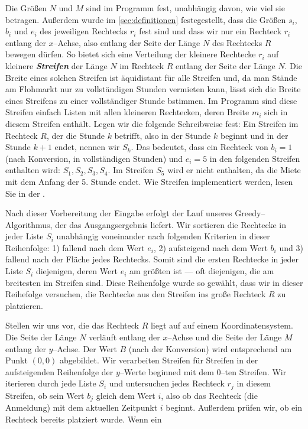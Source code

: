 Die Größen $N$ und $M$ sind im Programm fest, unabhängig davon, wie viel sie betragen.
Außerdem wurde im \cref{sec:definitionen} festegestellt, dass die Größen $s_i$, $b_i$ und $e_i$
des jeweiligen Rechtecks $r_i$ fest sind und dass wir nur ein Rechteck $r_i$ entlang der $x$--Achse,
also entlang der Seite der Länge $N$ des Rechtecks $R$ bewegen dürfen.
So bietet sich eine Verteilung der kleinere Rechtecke $r_i$ auf kleinere \textit{\textbf{Streifen}}
der Länge $N$ im Rechteck $R$ entlang der Seite der Länge $N$.
Die Breite eines solchen Streifen ist äquidistant für alle Streifen und, da
man Stände am Flohmarkt nur zu vollständigen Stunden vermieten kann, lässt sich
die Breite eines Streifens zu einer vollständiger Stunde bstimmen.
Im Programm sind diese Streifen einfach Listen mit allen kleineren Rechtecken, 
deren Breite $m_i$ sich in diesem Streifen enthält.
Legen wir die folgende Schreibweise fest: Ein Streifen im Rechteck $R$, der die
Stunde $k$ betrifft, also in der Stunde $k$ beginnt und in der Stunde $k+1$ endet, nennen wir $S_k$.
Das bedeutet, dass ein Rechteck von $b_i = 1$ (nach Konversion, in vollständigen Stunden)
und $e_i = 5$ in den folgenden Streifen enthalten wird: $S_1, S_2, S_3, S_4$. Im Streifen $S_5$
wird er nicht enthalten, da die Miete mit dem Anfang der 5. Stunde endet.
Wie Streifen implementiert werden, lesen Sie in der .

Nach dieser Vorbereitung der Eingabe erfolgt der Lauf unseres Greedy--Algorithmus, der das
Ausgangsergebnis liefert.
Wir sortieren die Rechtecke in jeder Liste $S_i$ unabhängig voneinander nach folgenden Kriterien
in dieser Reihenfolge: 
1) fallend nach dem Wert $e_i$,
2) aufsteigend nach dem Wert $b_i$ und
3) fallend nach der Fläche jedes Rechtecks. 
Somit sind die ersten Rechtecke in jeder Liste $S_i$ diejenigen,
deren Wert $e_i$ am größten ist --- oft diejenigen, die am breitesten im Streifen sind.
Diese Reihenfolge wurde so gewählt, dass wir in dieser Reihefolge versuchen,
die Rechtecke aus den Streifen ins große Rechteck $R$ zu platzieren.

Stellen wir uns vor, die das Rechteck $R$ liegt auf auf einem Koordinatensystem.
Die Seite der Länge $N$ verläuft entlang der $x$--Achse und die Seite der Länge
$M$ entlang der $y$--Achse.
Der Wert $B$ (nach der Konversion) wird entsprechend am Punkt $(0, 0)$ abgebildet.
Wir verarbeiten Streifen für Streifen in der
aufsteigenden Reihenfolge der $y$--Werte beginned mit dem 0--ten Streifen.
Wir iterieren durch jede Liste $S_i$ und untersuchen jedes Rechteck $r_j$ in diesem
Streifen, ob sein Wert $b_j$ gleich dem Wert $i$, also ob das Rechteck (die Anmeldung) mit dem
aktuellen Zeitpunkt $i$ beginnt. Außerdem prüfen wir, ob ein Rechteck bereits platziert wurde.
Wenn ein 



